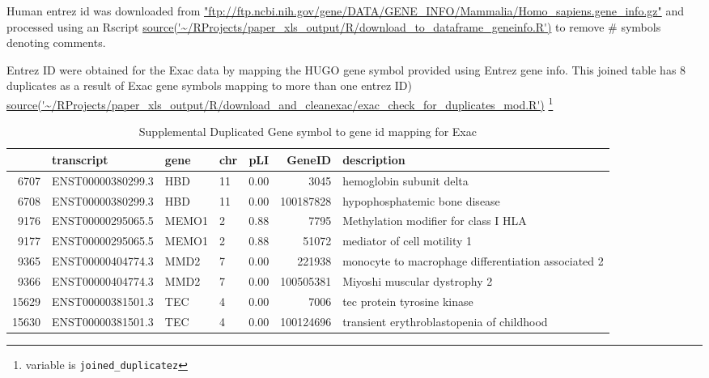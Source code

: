 
Human entrez id was downloaded from
\url{"ftp://ftp.ncbi.nih.gov/gene/DATA/GENE_INFO/Mammalia/Homo_sapiens.gene_info.gz"} and processed using an Rscript \url{source('~/RProjects/paper_xls_output/R/download_to_dataframe_geneinfo.R')} to remove \# symbols denoting comments. 





Entrez ID were obtained for the Exac data by mapping the  HUGO gene symbol provided using Entrez gene info. This joined table has 8 duplicates as a result of Exac gene symbols mapping to more than one entrez ID)
\url{source('~/RProjects/paper_xls_output/R/download_and_cleanexac/exac_check_for_duplicates_mod.R')}
\footnote{variable is
\texttt{joined\_duplicatez}}
\begin{table}[ht]
\centering
\begin{tabular}{rlllrrl}
  \hline
 & transcript & gene & chr & pLI & GeneID & description \\ 
  \hline
6707 & ENST00000380299.3 & HBD & 11 & 0.00 & 3045 & hemoglobin subunit delta \\ 
  6708 & ENST00000380299.3 & HBD & 11 & 0.00 & 100187828 & hypophosphatemic bone disease \\ 
  9176 & ENST00000295065.5 & MEMO1 & 2 & 0.88 & 7795 & Methylation modifier for class I HLA \\ 
  9177 & ENST00000295065.5 & MEMO1 & 2 & 0.88 & 51072 & mediator of cell motility 1 \\ 
  9365 & ENST00000404774.3 & MMD2 & 7 & 0.00 & 221938 & monocyte to macrophage differentiation associated 2 \\ 
  9366 & ENST00000404774.3 & MMD2 & 7 & 0.00 & 100505381 & Miyoshi muscular dystrophy 2 \\ 
  15629 & ENST00000381501.3 & TEC & 4 & 0.00 & 7006 & tec protein tyrosine kinase \\ 
  15630 & ENST00000381501.3 & TEC & 4 & 0.00 & 100124696 & transient erythroblastopenia of childhood \\ 
   \hline
\end{tabular}
\caption{Supplemental Duplicated Gene symbol to gene id mapping for Exac}
\label{tab:supp duplicated gene symbol for exac entrez}
\end{table}



